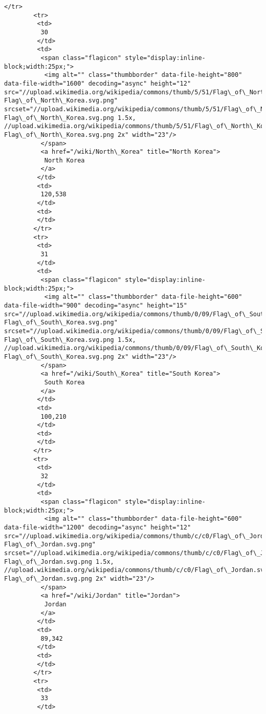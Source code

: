 \documentclass[11pt]{article}
\begin{document}
\begin{Verbatim}[commandchars=\\\{\}]
        </tr>
        <tr>
         <td>
          30
         </td>
         <td>
          <span class="flagicon" style="display:inline-block;width:25px;">
           <img alt="" class="thumbborder" data-file-height="800" data-file-width="1600" decoding="async" height="12" src="//upload.wikimedia.org/wikipedia/commons/thumb/5/51/Flag\_of\_North\_Korea.svg/23px-Flag\_of\_North\_Korea.svg.png" srcset="//upload.wikimedia.org/wikipedia/commons/thumb/5/51/Flag\_of\_North\_Korea.svg/35px-Flag\_of\_North\_Korea.svg.png 1.5x, //upload.wikimedia.org/wikipedia/commons/thumb/5/51/Flag\_of\_North\_Korea.svg/46px-Flag\_of\_North\_Korea.svg.png 2x" width="23"/>
          </span>
          <a href="/wiki/North\_Korea" title="North Korea">
           North Korea
          </a>
         </td>
         <td>
          120,538
         </td>
         <td>
         </td>
        </tr>
        <tr>
         <td>
          31
         </td>
         <td>
          <span class="flagicon" style="display:inline-block;width:25px;">
           <img alt="" class="thumbborder" data-file-height="600" data-file-width="900" decoding="async" height="15" src="//upload.wikimedia.org/wikipedia/commons/thumb/0/09/Flag\_of\_South\_Korea.svg/23px-Flag\_of\_South\_Korea.svg.png" srcset="//upload.wikimedia.org/wikipedia/commons/thumb/0/09/Flag\_of\_South\_Korea.svg/35px-Flag\_of\_South\_Korea.svg.png 1.5x, //upload.wikimedia.org/wikipedia/commons/thumb/0/09/Flag\_of\_South\_Korea.svg/45px-Flag\_of\_South\_Korea.svg.png 2x" width="23"/>
          </span>
          <a href="/wiki/South\_Korea" title="South Korea">
           South Korea
          </a>
         </td>
         <td>
          100,210
         </td>
         <td>
         </td>
        </tr>
        <tr>
         <td>
          32
         </td>
         <td>
          <span class="flagicon" style="display:inline-block;width:25px;">
           <img alt="" class="thumbborder" data-file-height="600" data-file-width="1200" decoding="async" height="12" src="//upload.wikimedia.org/wikipedia/commons/thumb/c/c0/Flag\_of\_Jordan.svg/23px-Flag\_of\_Jordan.svg.png" srcset="//upload.wikimedia.org/wikipedia/commons/thumb/c/c0/Flag\_of\_Jordan.svg/35px-Flag\_of\_Jordan.svg.png 1.5x, //upload.wikimedia.org/wikipedia/commons/thumb/c/c0/Flag\_of\_Jordan.svg/46px-Flag\_of\_Jordan.svg.png 2x" width="23"/>
          </span>
          <a href="/wiki/Jordan" title="Jordan">
           Jordan
          </a>
         </td>
         <td>
          89,342
         </td>
         <td>
         </td>
        </tr>
        <tr>
         <td>
          33
         </td>

\end{Verbatim}
\end{document}
